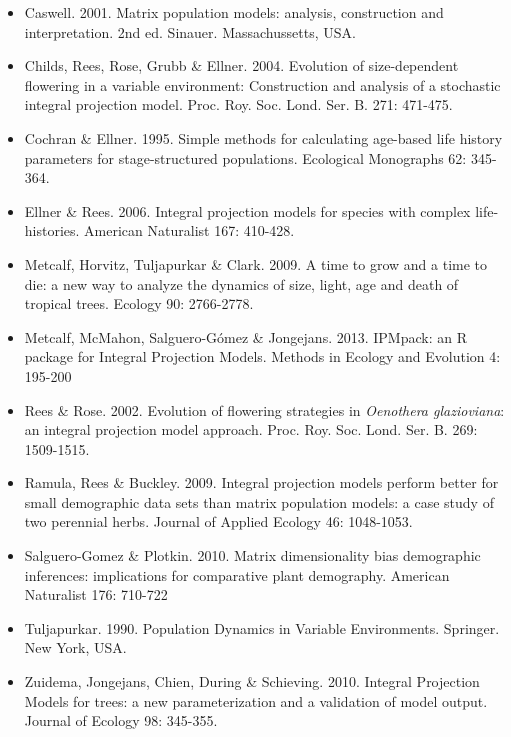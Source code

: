 \documentclass{article}
\begin{document}
\begin{itemize}
\item Caswell. 2001. Matrix population models: analysis, construction and interpretation. 2nd ed. Sinauer. Massachussetts, USA.

\item Childs, Rees, Rose, Grubb \& Ellner. 2004. Evolution of size-dependent flowering in a variable environment: Construction and analysis of a stochastic integral projection model. Proc. Roy. Soc. Lond. Ser. B. 271: 471-475.

\item Cochran \& Ellner. 1995. Simple methods for calculating age-based life history parameters for stage-structured populations. Ecological Monographs 62: 345-364.

\item Ellner \& Rees. 2006. Integral projection models for species with complex life-histories. American Naturalist 167: 410-428.

\item Metcalf, Horvitz, Tuljapurkar \& Clark. 2009. A time to grow and a time to die: a  new way to analyze the dynamics of size, light, age and death of tropical trees. Ecology 90: 2766-2778.

\item Metcalf, McMahon, Salguero-G\'omez \& Jongejans. 2013. IPMpack: an R
package for Integral Projection Models. Methods in Ecology and Evolution 4: 195-200

\item Rees \& Rose. 2002. Evolution of flowering strategies in {\it Oenothera
glazioviana}: an integral projection model approach. Proc. Roy. Soc. Lond. Ser.
B. 269: 1509-1515.

\item Ramula, Rees \& Buckley. 2009. Integral projection models perform better for small demographic data sets than matrix population models: a case study of two perennial herbs. Journal of Applied Ecology 46: 1048-1053.

\item Salguero-Gomez \& Plotkin. 2010. Matrix dimensionality bias demographic inferences: implications for comparative plant demography. American Naturalist 176: 710-722

\item Tuljapurkar. 1990. Population Dynamics in Variable Environments. Springer. New York, USA.

\item Zuidema, Jongejans, Chien, During \& Schieving. 2010. Integral Projection Models for trees: a new parameterization and a validation of model output. Journal of Ecology 98: 345-355.


\end{itemize}
\end{document}
